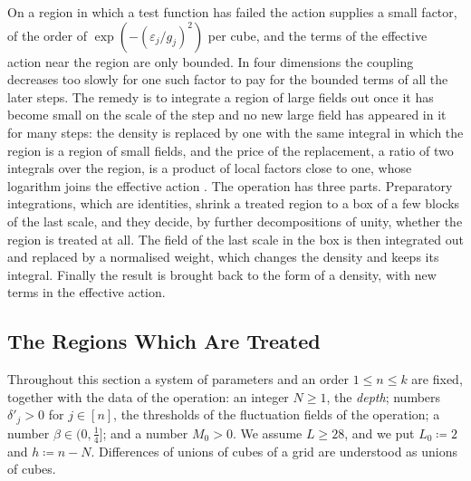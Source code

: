 \documentclass[11pt]{preprint}
\numberwithin{equation}{section}
\begin{document}
On a region in which a test function has failed the action supplies a small factor, of the order of $\exp(-(\varepsilon_j/g_j)^2)$ per cube, and the terms of the effective action near the region are only bounded. In four dimensions the coupling decreases too slowly for one such factor to pay for the bounded terms of all the later steps. The remedy is to integrate a region of large fields out once it has become small on the scale of the step and no new large field has appeared in it for many steps: the density is replaced by one with the same integral in which the region is a region of small fields, and the price of the replacement, a ratio of two integrals over the region, is a product of local factors close to one, whose logarithm joins the effective action \cite{BalabanLFR1,BalabanLFR2}. The operation has three parts. Preparatory integrations, which are identities, shrink a treated region to a box of a few blocks of the last scale, and they decide, by further decompositions of unity, whether the region is treated at all. The field of the last scale in the box is then integrated out and replaced by a normalised weight, which changes the density and keeps its integral. Finally the result is brought back to the form of a density, with new terms in the effective action.

\subsection{The Regions Which Are Treated}\label{sec:treated-regions}

Throughout this section a system of parameters and an order $1 \leqslant n \leqslant k$ are fixed, together with the data of the operation: an integer $N \geqslant 1$, the \emph{depth}; numbers $\delta'_j > 0$ for $j \in [n]$, the thresholds of the fluctuation fields of the operation; a number $\beta \in (0, \frac{1}{4}]$; and a number $M_0 > 0$. We assume $L \geqslant 28$, and we put $L_0 \coloneqq 2$ and $h \coloneqq n - N$. Differences of unions of cubes of a grid are understood as unions of cubes.
\end{document}
